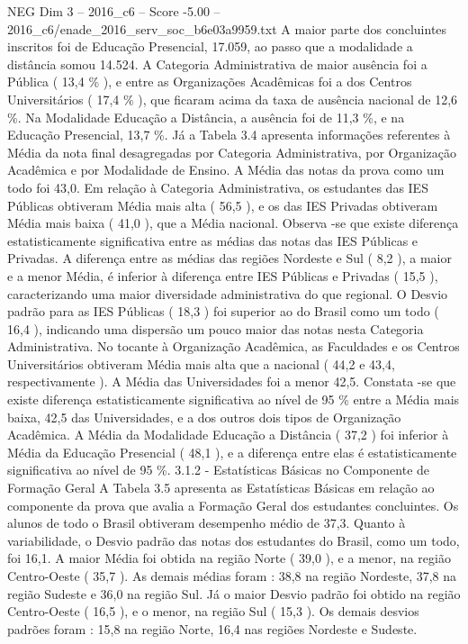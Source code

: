 \begin{textsample}{NEG Dim 3 – 2016\_c6 – Score -5.00 – 2016\_c6/enade\_2016\_serv\_soc\_b6e03a9959.txt}
A maior parte dos concluintes inscritos foi de Educação Presencial, 17.059, ao passo que a modalidade a distância somou 14.524.
A Categoria Administrativa de maior ausência foi a Pública ( 13,4 \% ), e entre as Organizações Acadêmicas foi a dos Centros Universitários ( 17,4 \% ), que ficaram acima da taxa de ausência nacional de 12,6 \%.
Na Modalidade Educação a Distância, a ausência foi de 11,3 \%, e na Educação Presencial, 13,7 \%.
Já a Tabela 3.4 apresenta informações referentes à Média da nota final desagregadas por Categoria Administrativa, por Organização Acadêmica e por Modalidade de Ensino.
A Média das notas da prova como um todo foi 43,0.
Em relação à Categoria Administrativa, os estudantes das IES Públicas obtiveram Média mais alta ( 56,5 ), e os das IES Privadas obtiveram Média mais baixa ( 41,0 ), que a Média nacional.
Observa -se que existe diferença estatisticamente significativa entre as médias das notas das IES Públicas e Privadas.
A diferença entre as médias das regiões Nordeste e Sul ( 8,2 ), a maior e a menor Média, é inferior à diferença entre IES Públicas e Privadas ( 15,5 ), caracterizando uma maior diversidade administrativa do que regional.
O Desvio padrão para as IES Públicas ( 18,3 ) foi superior ao do Brasil como um todo ( 16,4 ), indicando uma dispersão um pouco maior das notas nesta Categoria Administrativa.
No tocante à Organização Acadêmica, as Faculdades e os Centros Universitários obtiveram Média mais alta que a nacional ( 44,2 e 43,4, respectivamente ).
A Média das Universidades foi a menor 42,5.
Constata -se que existe diferença estatisticamente significativa ao nível de 95 \% entre a Média mais baixa, 42,5 das Universidades, e a dos outros dois tipos de Organização Acadêmica.
A Média da Modalidade Educação a Distância ( 37,2 ) foi inferior à Média da Educação Presencial ( 48,1 ), e a diferença entre elas é estatisticamente significativa ao nível de 95 \%. 3.1.2 - Estatísticas Básicas no Componente de Formação Geral A Tabela 3.5 apresenta as Estatísticas Básicas em relação ao componente da prova que avalia a Formação Geral dos estudantes concluintes.
Os alunos de todo o Brasil obtiveram desempenho médio de 37,3.
Quanto à variabilidade, o Desvio padrão das notas dos estudantes do Brasil, como um todo, foi 16,1.
A maior Média foi obtida na região Norte ( 39,0 ), e a menor, na região Centro-Oeste ( 35,7 ).
As demais médias foram : 38,8 na região Nordeste, 37,8 na região Sudeste e 36,0 na região Sul.
Já o maior Desvio padrão foi obtido na região Centro-Oeste ( 16,5 ), e o menor, na região Sul ( 15,3 ).
Os demais desvios padrões foram : 15,8 na região Norte, 16,4 nas regiões Nordeste e Sudeste.

\end{textsample}
